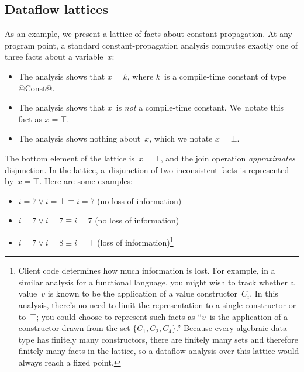 \documentclass[blockstyle,preprint,natbib,nocopyrightspace]{sigplanconf}
\newcommand{\authornote}[1]{{\em #1}}
\def\authornote#1{\unskip\relax}
\newcommand{\simon}[1]{\authornote{SLPJ: #1}}
\begin{document}
\subsection{Dataflow lattices}


As an example, 
we present a lattice of facts about constant propagation.
At any program point, a standard constant-propagation analysis
computes exactly one of three
facts about a variable~$x$:
\begin{itemize}
\item
The analysis shows that
$x = k$, where $k$~is a compile-time constant of type @Const@.
\item
The analysis shows that $x$~is \emph{not} a compile-time constant.
We~notate this fact as $x = \top$.
\item
The analysis shows nothing about~$x$, which we notate $x=\bot$.
\end{itemize}
The bottom element of the lattice is~$x=\bot$, and
the join operation \emph{approximates} disjunction.
\simon{No empahsis needed.}
In the lattice, a~disjunction of two inconsistent facts is represented by~$x=\top$.
\simon{I'd still like to give an intuition here about
\emph{why} disjunction is the key operation, and/or where is is used.
For example: ``Disjunction is to combine constant-propagation facts
arriving at a label; for example, if two blocks branch to L, and $x=7$ holds
at one branch, while $x=8$ holds at the, then the disjunction $x=7 \lor x=8$ holds
at L.  In the particular language of facts chosen above, this disjunction
approximated by $x=\top$.''  Oh, and this would be a better place for the footnote.}
Here are some examples:
\begin{itemize}
\item
$i = 7 \lor i=\bot \equiv i=7$ (no loss of information)
\item
$i = 7 \lor i= 7 \equiv  i=7$ (no loss of information)
\item
$i = 7 \lor i = 8 \equiv i = \top$ (loss of information)\footnote
{Client code determines how much information is lost.
For example, in a similar analysis for a functional language,
you might wish to track whether a value~$v$ is known to
be the application of a value constructor~$C_i$.
In this analysis, there's no need to limit the representation to a
single constructor or to~$\top$;
you could choose to represent such facts as ``$v$~is
the application of a constructor drawn from the set $\{C_1, C_2,
C_4\}$.''
Because every algebraic data type has finitely many constructors,
there are finitely many sets and therefore finitely many facts in the
lattice, so a dataflow analysis over this lattice would always reach a
fixed point.
}

\end{itemize}
\end{document}

